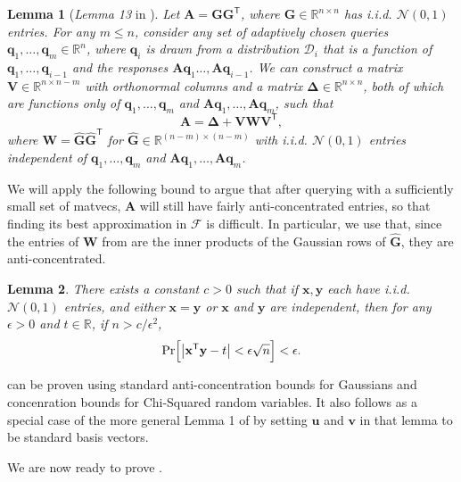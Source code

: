 \documentclass{article}[11pt]
\newtheorem{lemma}{Lemma}
\theoremstyle{definition}
\newcommand{\bv}[1]{\boldsymbol{\mathbf{#1}}}
\newcommand{\R}{\mathbb{R}}
\newcommand{\T}{\mathsf{T}}
\newcommand{\F}{\mathcal{F}}
\begin{document}
\begin{lemma}[{\protect\textit{Lemma 13} in \cite{BravermanHazanSimchowitz:2020}}]\label{lem:wishart_query}
    Let $\bv A= \bv G \bv G^\T$, where $\bv{G} \in \mathbb{R}^{n \times n}$ has i.i.d. $\mathcal{N}(0, 1)$ entries. For any $m \leq n$, consider any set of adaptively chosen queries $\bv{q}_1, \ldots, \bv{q}_m \in \R^{n}$, where $\bv{q}_i$ is drawn from a distribution $\mathcal{D}_i$ that is a function of $\bv{q}_1, \ldots, \bv{q}_{i-1}$ and the responses $\bv{A} \bv q_1\ldots,\bv A \bv q_{i-1}$. We can construct a matrix $\bv{V} \in \mathbb{R}^{n\times n-m}$ with orthonormal columns and a matrix $\bv{\Delta}\in \mathbb{R}^{n\times n}$, both of which are functions only of $\bv{q}_1,\ldots,\bv q_m$ and $\bv A \bv q_1,\ldots,\bv A \bv q_m$,
    such that
    \[
    \bv A= \bv{\Delta}+\bv{V}\bv{W}\bv{V}^\T,
    \]
    where 
    $\bv{W}=\widehat{\bv{G}}\widehat{\bv{G}}^\T$ for $\widehat{\bv{G}} \in \mathbb{R}^{(n-m)\times(n-m)}$ with  i.i.d. $ \mathcal N(0,1)$ entries independent of $\bv{q}_1,\ldots,\bv q_m$ and $\bv A \bv q_1,\ldots,\bv A \bv q_m$.
\end{lemma}

We will apply the following bound to argue that after querying with a sufficiently small set of matvecs, $\bv A$ will still have fairly anti-concentrated entries, so that finding its best approximation in $\F$ is difficult. In particular, we use that, since the entries of $\bv W$ from  are the inner products of the Gaussian rows of $\widehat{\bv G}$, they are anti-concentrated.




\begin{lemma}\label{lem:gausian-inner-prod} There exists a constant $c >0$ such that if $\bv x,\bv y$ each have i.i.d. $\mathcal N(0, 1)$ entries, and either $\bv x = \bv y$ or $\bv x$ and $\bv y$ are independent,
    then for any $\epsilon>0$ and $t\in\R$, if $n > c/ \epsilon^2$,
        \[
        \Pr\Bigl[ \big| \bv{x}^\T\bv{y} - t \big| < \epsilon \sqrt{n} \Bigr] < \epsilon.
    \]
\end{lemma}
 can be proven using standard anti-concentration bounds for Gaussians and concenration bounds for Chi-Squared random variables.
It also follows as a special case of the more general Lemma 1 of \cite{AmselChenHalikias:2024} by setting $\bv u$ and $\bv v$ in that lemma to be standard basis vectors. 

We are now ready to prove .
\end{document}
